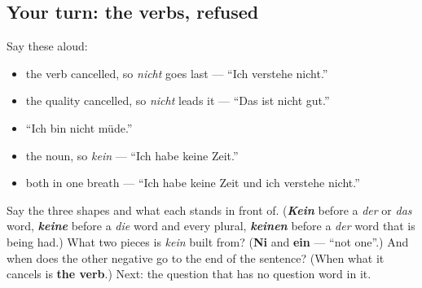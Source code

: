 \subsection*{Your turn: the verbs, refused}
Say these aloud:

\begin{itemize}
\raggedright
  \item the verb cancelled, so \emph{nicht} goes last — \textquotedblleft{}Ich verstehe nicht.\textquotedblright{}
  \item the quality cancelled, so \emph{nicht} leads it — \textquotedblleft{}Das ist nicht gut.\textquotedblright{}
  \item \textquotedblleft{}Ich bin nicht müde.\textquotedblright{}
  \item the noun, so \emph{kein} — \textquotedblleft{}Ich habe keine Zeit.\textquotedblright{}
  \item both in one breath — \textquotedblleft{}Ich habe keine Zeit und ich verstehe nicht.\textquotedblright{}
\end{itemize}

\begin{tcolorbox}[breakable,colback=teal!4,colframe=teal!35!black,title={Before you move on}]
Say the three shapes and what each stands in front of. (\emph{\textbf{Kein}} before a \emph{der} or \emph{das} word, \emph{\textbf{keine}} before a \emph{die} word and every plural, \emph{\textbf{keinen}} before a \emph{der} word that is being had.) What two pieces is \emph{kein} built from? (\textbf{Ni} and \textbf{ein} — \textquotedblleft{}not one\textquotedblright{}.) And when does the other negative go to the end of the sentence? (When what it cancels is \textbf{the verb}.) Next: the question that has no question word in it.
\end{tcolorbox}
